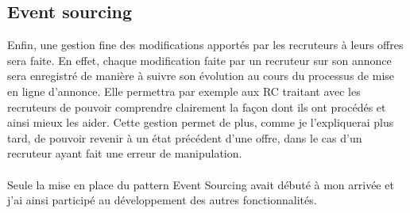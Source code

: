 \subsection{Event sourcing}
\label{sub:Event sourcing}
Enfin, une gestion fine des modifications apportés par les recruteurs à leurs offres sera faite.
En effet, chaque modification faite par un recruteur sur son annonce sera enregistré de manière à suivre son évolution au cours du processus de mise en ligne d'annonce.
Elle permettra par exemple aux RC traitant avec les recruteurs de pouvoir comprendre clairement la façon dont ils ont procédés et ainsi mieux les aider.
Cette gestion permet de plus, comme je l'expliquerai plus tard, de pouvoir revenir à un état précédent d'une offre, dans le cas d'un recruteur ayant fait une erreur de manipulation.

\paragraph{}
Seule la mise en place du pattern Event Sourcing avait débuté à mon arrivée et j'ai ainsi participé au développement des autres fonctionnalités.
